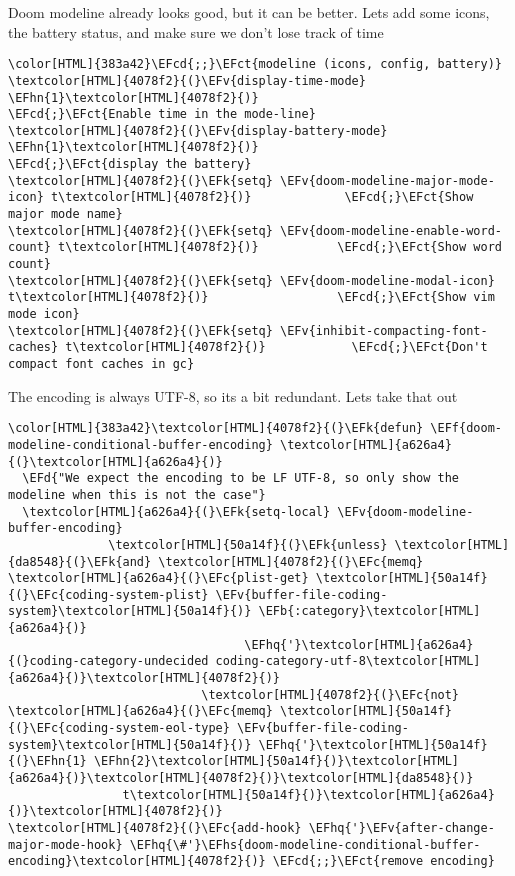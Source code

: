 \documentclass{scrartcl}
\newcommand{\EFk}[1]{\textcolor{EFk}{#1}} %
\newcommand{\EFd}[1]{\textcolor{EFd}{\textit{#1}}} %
\newcommand{\EFb}[1]{\textcolor{EFb}{#1}} %
\newcommand{\EFct}[1]{\textcolor{EFct}{#1}} %
\newcommand{\EFc}[1]{\textcolor{EFc}{#1}} %
\newcommand{\EFv}[1]{\textcolor{EFv}{#1}} %
\newcommand{\EFf}[1]{\textcolor{EFf}{#1}} %
\newcommand{\EFcd}[1]{\textcolor{EFcd}{#1}} %
\newcommand{\EFhn}[1]{\textcolor{EFhn}{\textbf{#1}}} %
\newcommand{\EFhq}[1]{\textcolor{EFhq}{#1}} %
\newcommand{\EFhs}[1]{\textcolor{EFhs}{#1}} %
\begin{document}
Doom modeline already looks good, but it can be better. Lets add some icons, the battery status, and make sure we don't lose track of time
\begin{Code}
\begin{Verbatim}[]
\color[HTML]{383a42}\EFcd{;;}\EFct{modeline (icons, config, battery)}
\textcolor[HTML]{4078f2}{(}\EFv{display-time-mode} \EFhn{1}\textcolor[HTML]{4078f2}{)}                              \EFcd{;}\EFct{Enable time in the mode-line}
\textcolor[HTML]{4078f2}{(}\EFv{display-battery-mode} \EFhn{1}\textcolor[HTML]{4078f2}{)}                             \EFcd{;}\EFct{display the battery}
\textcolor[HTML]{4078f2}{(}\EFk{setq} \EFv{doom-modeline-major-mode-icon} t\textcolor[HTML]{4078f2}{)}             \EFcd{;}\EFct{Show major mode name}
\textcolor[HTML]{4078f2}{(}\EFk{setq} \EFv{doom-modeline-enable-word-count} t\textcolor[HTML]{4078f2}{)}           \EFcd{;}\EFct{Show word count}
\textcolor[HTML]{4078f2}{(}\EFk{setq} \EFv{doom-modeline-modal-icon} t\textcolor[HTML]{4078f2}{)}                  \EFcd{;}\EFct{Show vim mode icon}
\textcolor[HTML]{4078f2}{(}\EFk{setq} \EFv{inhibit-compacting-font-caches} t\textcolor[HTML]{4078f2}{)}            \EFcd{;}\EFct{Don't compact font caches in gc}
\end{Verbatim}
\end{Code}

The encoding is always UTF-8, so its a bit redundant. Lets take that out
\begin{Code}
\begin{Verbatim}[]
\color[HTML]{383a42}\textcolor[HTML]{4078f2}{(}\EFk{defun} \EFf{doom-modeline-conditional-buffer-encoding} \textcolor[HTML]{a626a4}{(}\textcolor[HTML]{a626a4}{)}
  \EFd{"We expect the encoding to be LF UTF-8, so only show the modeline when this is not the case"}
  \textcolor[HTML]{a626a4}{(}\EFk{setq-local} \EFv{doom-modeline-buffer-encoding}
              \textcolor[HTML]{50a14f}{(}\EFk{unless} \textcolor[HTML]{da8548}{(}\EFk{and} \textcolor[HTML]{4078f2}{(}\EFc{memq} \textcolor[HTML]{a626a4}{(}\EFc{plist-get} \textcolor[HTML]{50a14f}{(}\EFc{coding-system-plist} \EFv{buffer-file-coding-system}\textcolor[HTML]{50a14f}{)} \EFb{:category}\textcolor[HTML]{a626a4}{)}
                                 \EFhq{'}\textcolor[HTML]{a626a4}{(}coding-category-undecided coding-category-utf-8\textcolor[HTML]{a626a4}{)}\textcolor[HTML]{4078f2}{)}
                           \textcolor[HTML]{4078f2}{(}\EFc{not} \textcolor[HTML]{a626a4}{(}\EFc{memq} \textcolor[HTML]{50a14f}{(}\EFc{coding-system-eol-type} \EFv{buffer-file-coding-system}\textcolor[HTML]{50a14f}{)} \EFhq{'}\textcolor[HTML]{50a14f}{(}\EFhn{1} \EFhn{2}\textcolor[HTML]{50a14f}{)}\textcolor[HTML]{a626a4}{)}\textcolor[HTML]{4078f2}{)}\textcolor[HTML]{da8548}{)}
                t\textcolor[HTML]{50a14f}{)}\textcolor[HTML]{a626a4}{)}\textcolor[HTML]{4078f2}{)}
\textcolor[HTML]{4078f2}{(}\EFc{add-hook} \EFhq{'}\EFv{after-change-major-mode-hook} \EFhq{\#'}\EFhs{doom-modeline-conditional-buffer-encoding}\textcolor[HTML]{4078f2}{)} \EFcd{;;}\EFct{remove encoding}
\end{Verbatim}
\end{Code}
\end{document}
